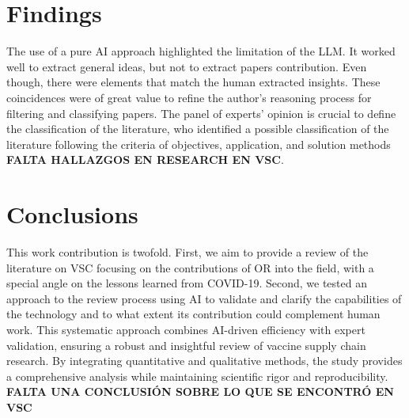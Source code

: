 \documentclass{optica-article}
\begin{document}
\section{Findings}

The use of a pure AI approach highlighted the limitation of the LLM. It worked well to extract general ideas, but not to extract papers contribution. Even though, there were elements that match the human extracted insights. These coincidences were of great value to refine the author's reasoning process for filtering and classifying papers. The panel of experts’ opinion is crucial to define the classification of the literature, who identified a possible classification of the literature following the criteria of objectives, application, and solution methods \textbf{FALTA HALLAZGOS EN RESEARCH EN VSC}.

\section{Conclusions}

This work contribution is twofold. First, we aim to provide a review of the literature on VSC focusing on the contributions of OR into the field, with a special angle on the lessons learned from COVID-19. Second, we tested an approach to the review process using AI to validate and clarify the capabilities of the technology and to what extent its contribution could complement human work. This systematic approach combines AI-driven efficiency with expert validation, ensuring a robust and insightful review of vaccine supply chain research. By integrating quantitative and qualitative methods, the study provides a comprehensive analysis while maintaining scientific rigor and reproducibility. \textbf{FALTA UNA CONCLUSIÓN SOBRE LO QUE SE ENCONTRÓ EN VSC}
 






\end{document}
